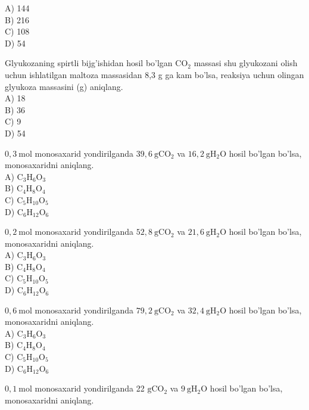 A) 144\\
B) 216\\
C) 108\\
D) 54
  \item Glyukozaning spirtli bijg'ishidan hosil bo'lgan $\mathrm{CO}_{2}$ massasi shu glyukozani olish uchun ishlatilgan maltoza massasidan 8,3 g ga kam bo'lsa, reaksiya uchun olingan glyukoza massasini (g) aniqlang.\\
A) 18\\
B) 36\\
C) 9\\
D) 54
  \item $0,3 \mathrm{~mol}$ monosaxarid yondirilganda $39,6 \mathrm{~g} \mathrm{CO}_{2}$ va $16,2 \mathrm{~g} \mathrm{H}_{2} \mathrm{O}$ hosil bo'lgan bo'lsa, monosaxaridni aniqlang.\\
A) $\mathrm{C}_{3} \mathrm{H}_{6} \mathrm{O}_{3}$\\
B) $\mathrm{C}_{4} \mathrm{H}_{8} \mathrm{O}_{4}$\\
C) $\mathrm{C}_{5} \mathrm{H}_{10} \mathrm{O}_{5}$\\
D) $\mathrm{C}_{6} \mathrm{H}_{12} \mathrm{O}_{6}$
  \item $0,2 \mathrm{~mol}$ monosaxarid yondirilganda $52,8 \mathrm{~g} \mathrm{CO}_{2}$ va $21,6 \mathrm{~g} \mathrm{H}_{2} \mathrm{O}$ hosil bo'lgan bo'lsa, monosaxaridni aniqlang.\\
A) $\mathrm{C}_{3} \mathrm{H}_{6} \mathrm{O}_{3}$\\
B) $\mathrm{C}_{4} \mathrm{H}_{8} \mathrm{O}_{4}$\\
C) $\mathrm{C}_{5} \mathrm{H}_{10} \mathrm{O}_{5}$\\
D) $\mathrm{C}_{6} \mathrm{H}_{12} \mathrm{O}_{6}$
  \item $0,6 \mathrm{~mol}$ monosaxarid yondirilganda $79,2 \mathrm{~g} \mathrm{CO}_{2}$ va $32,4 \mathrm{~g} \mathrm{H}_{2} \mathrm{O}$ hosil bo'lgan bo'lsa, monosaxaridni aniqlang.\\
A) $\mathrm{C}_{3} \mathrm{H}_{6} \mathrm{O}_{3}$\\
B) $\mathrm{C}_{4} \mathrm{H}_{8} \mathrm{O}_{4}$\\
C) $\mathrm{C}_{5} \mathrm{H}_{10} \mathrm{O}_{5}$\\
D) $\mathrm{C}_{6} \mathrm{H}_{12} \mathrm{O}_{6}$
  \item $0,1 \mathrm{~mol}$ monosaxarid yondirilganda 22 $\mathrm{g} \mathrm{CO}_{2}$ va $9 \mathrm{~g} \mathrm{H}_{2} \mathrm{O}$ hosil bo'lgan bo'lsa, monosaxaridni aniqlang.\\
